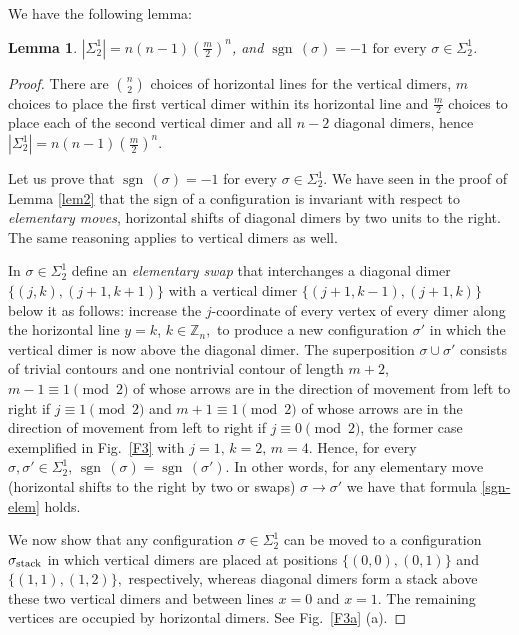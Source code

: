 \documentclass[12pt,reqno]{amsart}
\numberwithin{equation}{section}
\newcommand{\Z}{{\mathbb Z}}
\newcommand{\sg}{\sigma}
\newcommand{\sgn}{{\operatorname{sgn}\,}}
\newtheorem{lem}[theo]{{\sc \bf Lemma}}
\begin{document}
We have the following lemma:
\begin{lem}\label{lem44.3}
$|\Sigma_2^1|=n(n-1)\left(\frac{m}{2}\right)^n$, and $\sgn(\sigma)=-1 \text{ for every } \sg\in\Sigma_2^1$.
\end{lem}
\begin{proof}
There are $\binom{n}{2}$ choices of horizontal lines for the vertical dimers, $m$ choices to place the first vertical dimer within its horizontal line and $\frac{m}{2}$ choices to place each of the second vertical dimer and all $n-2$ diagonal dimers, hence $|\Sigma_2^1|=n(n-1)\left(\frac{m}{2}\right)^n$.

Let us prove that $\sgn(\sigma)=-1$  for every $\sg\in\Sigma_2^1$. We have seen in the proof of Lemma \ref{lem2} that the sign of a configuration is invariant with respect to 
{\it elementary moves}, horizontal shifts of diagonal dimers by two units to the right.
The same reasoning applies to vertical dimers as well.

In $\sg\in\Sigma_2^1$ define an \textit{elementary swap} that interchanges a diagonal dimer $\{(j,k),(j+1,k+1)\}$ with a vertical dimer $\{(j+1,k-1),(j+1,k)\}$ below it as follows: increase the $j$-coordinate of every vertex of every dimer along the horizontal line $y=k$, $k\in \Z_n,$ to produce a new configuration $\sigma'$ in which the vertical dimer is now above the diagonal dimer. The superposition $\sigma\cup\sigma'$ consists of trivial contours and one nontrivial contour of length $m+2$, $m-1\equiv 1\pmod 2$ of whose arrows are in the direction of movement from left to right if $j\equiv 1\pmod 2$ and $m+1\equiv 1\pmod 2$ of whose arrows are in the direction of movement from left to right if $j\equiv 0\pmod 2$, the former case exemplified in Fig.\ \ref{F3} with $j=1,\,k=2,\,m=4$. Hence, for every $\sg,\sg'\in\Sigma_2^1,\, \sgn(\sg)=\sgn(\sg')$. 
In other words, for any elementary move (horizontal shifts to the right by two or swaps) $\sg\to\sg'$ we have that formula \eqref{sgn-elem} holds. 

We now show that any configuration $\sg\in\Sigma_2^1$ can be moved to a configuration $\sg_{\rm stack}$ in which vertical dimers are placed at positions $\{(0,0),(0,1)\}$ and $\{(1,1),(1,2)\},$ respectively, whereas diagonal dimers form a stack above these two vertical dimers and between lines $x=0$ and $x=1.$ The remaining vertices are occupied by horizontal dimers. See Fig.\ \ref{F3a} (a).


\end{proof}
\end{document}
